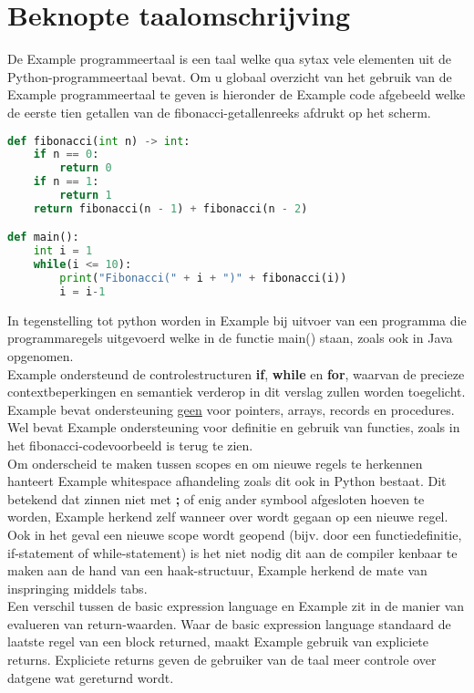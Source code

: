 \chapter{Beknopte taalomschrijving}
De Example programmeertaal is een taal welke qua sytax vele elementen uit de Python-programmeertaal bevat. Om u globaal overzicht van het gebruik van de Example programmeertaal te geven is hieronder de Example code afgebeeld welke de eerste tien getallen van de fibonacci-getallenreeks afdrukt op het scherm.
\begin{lstlisting}[language=Python]
def fibonacci(int n) -> int:
	if n == 0:
		return 0
	if n == 1:
		return 1
	return fibonacci(n - 1) + fibonacci(n - 2)

def main():
	int i = 1
	while(i <= 10):
		print("Fibonacci(" + i + ")" + fibonacci(i))
		i = i-1

\end{lstlisting}

In tegenstelling tot python worden in Example bij uitvoer van een programma die programmaregels uitgevoerd welke in de functie main() staan, zoals ook in Java opgenomen.\\

Example ondersteund de controlestructuren \textbf{if}, \textbf{while} en \textbf{for}, waarvan de precieze contextbeperkingen en semantiek verderop in dit verslag zullen worden toegelicht. Example bevat ondersteuning \underline{geen} voor pointers, arrays, records en procedures. Wel bevat Example ondersteuning voor definitie en gebruik van functies, zoals in het fibonacci-codevoorbeeld is terug te zien.\\

Om onderscheid te maken tussen scopes en om nieuwe regels te herkennen hanteert Example whitespace afhandeling zoals dit ook in Python bestaat. Dit betekend dat zinnen niet met \textbf{;} of enig ander symbool afgesloten hoeven te worden, Example herkend zelf wanneer over wordt gegaan op een nieuwe regel. Ook in het geval een nieuwe scope wordt geopend (bijv. door een functiedefinitie, if-statement of while-statement) is het niet nodig dit aan de compiler kenbaar te maken aan de hand van een haak-structuur, Example herkend de mate van inspringing middels tabs.\\

Een verschil tussen de basic expression language en Example zit in de manier van evalueren van return-waarden. Waar de basic expression language standaard de laatste regel van een block returned, maakt Example gebruik van expliciete returns. Expliciete returns geven de gebruiker van de taal meer controle over datgene wat gereturnd wordt.\\

